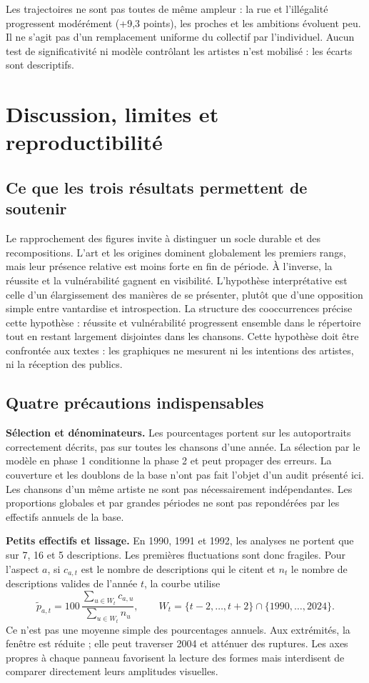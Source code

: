 \documentclass[a4paper,11pt]{article}
\begin{document}
Les trajectoires ne sont pas toutes de même ampleur : la rue et l'illégalité
progressent modérément (+9,3 points), les proches et les ambitions
évoluent peu. Il ne s'agit pas d'un remplacement uniforme du collectif par
l'individuel. Aucun test de significativité ni modèle contrôlant les artistes
n'est mobilisé : les écarts sont descriptifs.

\section{Discussion, limites et reproductibilité}
\subsection{Ce que les trois résultats permettent de soutenir}
Le rapprochement des figures invite à distinguer un socle durable et des
recompositions. L'art et les origines dominent globalement les premiers rangs,
mais leur présence relative est moins forte en fin de période. À l'inverse,
la réussite et la vulnérabilité gagnent en visibilité. L'hypothèse
interprétative est celle d'un élargissement des manières de se présenter,
plutôt que d'une opposition simple entre vantardise et introspection.
La structure des cooccurrences précise cette hypothèse : réussite et
vulnérabilité progressent ensemble dans le répertoire tout en restant
largement disjointes dans les chansons.
Cette hypothèse doit être confrontée aux textes : les graphiques ne
mesurent ni les intentions des artistes, ni la réception des publics.

\subsection{Quatre précautions indispensables}
\textbf{Sélection et dénominateurs.}
Les pourcentages portent sur les autoportraits correctement décrits, pas sur
toutes les chansons d'une année. La sélection par le modèle en phase 1
conditionne la phase 2 et peut propager des erreurs. La couverture et les
doublons de la base n'ont pas fait l'objet d'un audit présenté ici. Les
chansons d'un même artiste ne sont pas nécessairement indépendantes.
Les proportions globales et par grandes périodes ne sont pas repondérées
par les effectifs annuels de la base.

\textbf{Petits effectifs et lissage.}
En 1990, 1991 et 1992, les analyses ne portent que sur 7, 16 et 5 descriptions.
Les premières fluctuations sont donc fragiles. Pour l'aspect $a$, si $c_{a,t}$
est le nombre de descriptions qui le citent et $n_t$ le nombre de descriptions
valides de l'année $t$, la courbe utilise
\[
 \widetilde p_{a,t}
 =100\,\frac{\sum_{u\in W_t} c_{a,u}}{\sum_{u\in W_t} n_u},
 \qquad W_t=\{t-2,\ldots,t+2\}\cap\{1990,\ldots,2024\}.
\]
Ce n'est pas une moyenne simple des pourcentages annuels. Aux extrémités,
la fenêtre est réduite ; elle peut traverser 2004 et atténuer des ruptures.
Les axes propres à chaque panneau favorisent la lecture des formes mais
interdisent de comparer directement leurs amplitudes visuelles.
\end{document}
